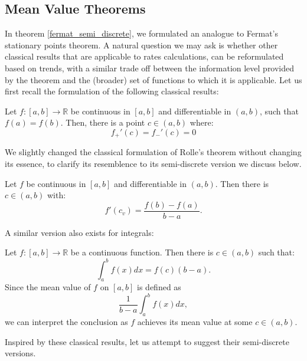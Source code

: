 \documentclass[11pt]{book}
\begin{document}
\subsection{Mean Value Theorems}

In theorem \ref{fermat_semi_discrete}, we formulated an analogue to Fermat's stationary points theorem. A natural question we may ask is whether other classical results that are applicable to rates calculations, can be reformulated based on trends, with a similar trade off between the information level provided by the theorem and the (broader) set of functions to which it is applicable. Let us first recall the formulation of the following classical results:

\begin{theorem}Let $f:\left[a,b\right]\rightarrow\mathbb{R}$ be continuous in $\left[a,b\right]$ and differentiable in $\left(a,b\right)$, such that $f\left(a\right)=f\left(b\right).$ Then, there is a point $c\in\left(a,b\right)$ where:
$$f_{+}'\left(c\right) = f_{-}'\left(c\right)=0$$
\label{rolle_theorem}
\end{theorem}
We slightly changed the classical formulation of Rolle's theorem without changing its essence, to clarify its resemblence to its semi-discrete version we discuss below.

\begin{theorem}Let $f$ be continuous in $\left[a,b\right]$ and differentiable in $\left(a,b\right)$. Then there is $c\in \left(a,b\right)$ with:
$$f'\left(c_{v}\right)=\frac{f\left(b\right)-f\left(a\right)}{b-a}.$$
\label{mvt_derivative_thm}
\end{theorem}

A similar version also exists for integrals:

\begin{theorem}Let $f:\left[a,b\right]\rightarrow\mathbb{R}$ be a continuous
function. Then there is $c\in\left(a,b\right)$ such that:
\[
\int_{a}^{b}f\left(x\right)dx=f\left(c\right)\left(b-a\right).
\]
Since the mean value of $f$ on $\left[a,b\right]$ is defined as
\[
\frac{1}{b-a}\int_{a}^{b}f\left(x\right)dx,
\]
we can interpret the conclusion as $f$ achieves its mean value at
some $c\in\left(a,b\right)$.
\label{mvt_integral_thm}
\end{theorem}

Inspired by these classical results, let us attempt to suggest their semi-discrete versions.
 
\end{document}
